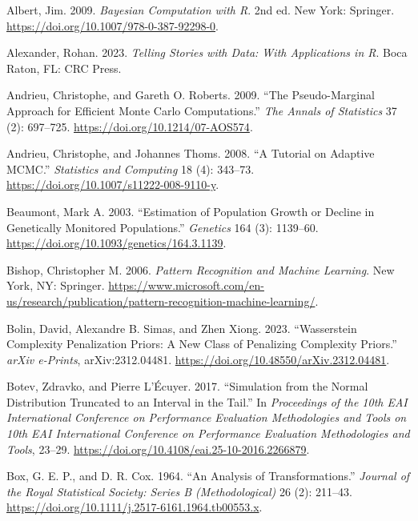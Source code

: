 \documentclass[
  11pt,
  letterpaper,
]{scrbook}
\newlength{\cslhangindent}
\newenvironment{CSLReferences}[2] %
 {\begin{list}{}{%
  \setlength{\itemindent}{0pt}
  \setlength{\leftmargin}{0pt}
  \setlength{\parsep}{0pt}
  \ifodd #1
   \setlength{\leftmargin}{\cslhangindent}
   \setlength{\itemindent}{-1\cslhangindent}
  \fi
  \setlength{\itemsep}{#2\baselineskip}}}
 {\end{list}}
\theoremstyle{plain}
\theoremstyle{definition}
\theoremstyle{definition}
\theoremstyle{plain}
\theoremstyle{plain}
\theoremstyle{definition}
\theoremstyle{remark}
\begin{document}
\label{refs}
\begin{CSLReferences}{1}{0}
Albert, Jim. 2009. \emph{Bayesian Computation with {R}}. 2nd ed. New
York: Springer. \url{https://doi.org/10.1007/978-0-387-92298-0}.

Alexander, Rohan. 2023. \emph{Telling Stories with Data: With
Applications in {R}}. Boca Raton, FL: CRC Press.

Andrieu, Christophe, and Gareth O. Roberts. 2009. {``The Pseudo-Marginal
Approach for Efficient {M}onte {C}arlo Computations.''} \emph{The Annals
of Statistics} 37 (2): 697--725.
\url{https://doi.org/10.1214/07-AOS574}.

Andrieu, Christophe, and Johannes Thoms. 2008. {``A Tutorial on Adaptive
{MCMC}.''} \emph{Statistics and Computing} 18 (4): 343--73.
\url{https://doi.org/10.1007/s11222-008-9110-y}.

Beaumont, Mark A. 2003. {``Estimation of Population Growth or Decline in
Genetically Monitored Populations.''} \emph{Genetics} 164 (3): 1139--60.
\url{https://doi.org/10.1093/genetics/164.3.1139}.

Bishop, Christopher M. 2006. \emph{Pattern Recognition and Machine
Learning}. New York, NY: Springer.
\url{https://www.microsoft.com/en-us/research/publication/pattern-recognition-machine-learning/}.

Bolin, David, Alexandre B. Simas, and Zhen Xiong. 2023. {``{W}asserstein
Complexity Penalization Priors: A New Class of Penalizing Complexity
Priors.''} \emph{arXiv e-Prints}, arXiv:2312.04481.
\url{https://doi.org/10.48550/arXiv.2312.04481}.

Botev, Zdravko, and Pierre L'Écuyer. 2017. {``Simulation from the Normal
Distribution Truncated to an Interval in the Tail.''} In
\emph{Proceedings of the 10th EAI International Conference on
Performance Evaluation Methodologies and Tools on 10th EAI International
Conference on Performance Evaluation Methodologies and Tools}, 23--29.
\url{https://doi.org/10.4108/eai.25-10-2016.2266879}.

Box, G. E. P., and D. R. Cox. 1964. {``An Analysis of
Transformations.''} \emph{Journal of the Royal Statistical Society:
Series B (Methodological)} 26 (2): 211--43.
\url{https://doi.org/10.1111/j.2517-6161.1964.tb00553.x}.


\end{CSLReferences}
\end{document}
